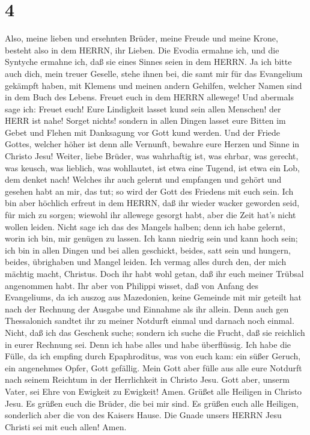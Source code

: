 \hypertarget{section-3}{%
\section{4}\label{section-3}}

 Also, meine lieben und ersehnten Brüder, meine Freude und
meine Krone, besteht also in dem HERRN, ihr Lieben.  Die
Evodia ermahne ich, und die Syntyche ermahne ich, daß sie eines Sinnes
seien in dem HERRN.  Ja ich bitte auch dich, mein treuer
Geselle, stehe ihnen bei, die samt mir für das Evangelium gekämpft
haben, mit Klemens und meinen andern Gehilfen, welcher Namen sind in dem
Buch des Lebens.  Freuet euch in dem HERRN allewege! Und
abermals sage ich: Freuet euch!  Eure Lindigkeit lasset kund
sein allen Menschen! der HERR ist nahe!  Sorget nichts!
sondern in allen Dingen lasset eure Bitten im Gebet und Flehen mit
Danksagung vor Gott kund werden.  Und der Friede Gottes,
welcher höher ist denn alle Vernunft, bewahre eure Herzen und Sinne in
Christo Jesu!  Weiter, liebe Brüder, was wahrhaftig ist, was
ehrbar, was gerecht, was keusch, was lieblich, was wohllautet, ist etwa
eine Tugend, ist etwa ein Lob, dem denket nach!  Welches ihr
auch gelernt und empfangen und gehört und gesehen habt an mir, das tut;
so wird der Gott des Friedens mit euch sein.  Ich bin aber
höchlich erfreut in dem HERRN, daß ihr wieder wacker geworden seid, für
mich zu sorgen; wiewohl ihr allewege gesorgt habt, aber die Zeit hat's
nicht wollen leiden.  Nicht sage ich das des Mangels
halben; denn ich habe gelernt, worin ich bin, mir genügen zu lassen.
 Ich kann niedrig sein und kann hoch sein; ich bin in allen
Dingen und bei allen geschickt, beides, satt sein und hungern, beides,
übrighaben und Mangel leiden.  Ich vermag alles durch den,
der mich mächtig macht, Christus.  Doch ihr habt wohl
getan, daß ihr euch meiner Trübsal angenommen habt.  Ihr
aber von Philippi wisset, daß von Anfang des Evangeliums, da ich auszog
aus Mazedonien, keine Gemeinde mit mir geteilt hat nach der Rechnung der
Ausgabe und Einnahme als ihr allein.  Denn auch gen
Thessalonich sandtet ihr zu meiner Notdurft einmal und darnach noch
einmal.  Nicht, daß ich das Geschenk suche; sondern ich
suche die Frucht, daß sie reichlich in eurer Rechnung sei. 
Denn ich habe alles und habe überflüssig. Ich habe die Fülle, da ich
empfing durch Epaphroditus, was von euch kam: ein süßer Geruch, ein
angenehmes Opfer, Gott gefällig.  Mein Gott aber fülle aus
alle eure Notdurft nach seinem Reichtum in der Herrlichkeit in Christo
Jesu.  Gott aber, unserm Vater, sei Ehre von Ewigkeit zu
Ewigkeit! Amen.  Grüßet alle Heiligen in Christo Jesu. Es
grüßen euch die Brüder, die bei mir sind.  Es grüßen euch
alle Heiligen, sonderlich aber die von des Kaisers Hause. 
Die Gnade unsers HERRN Jesu Christi sei mit euch allen! Amen.
